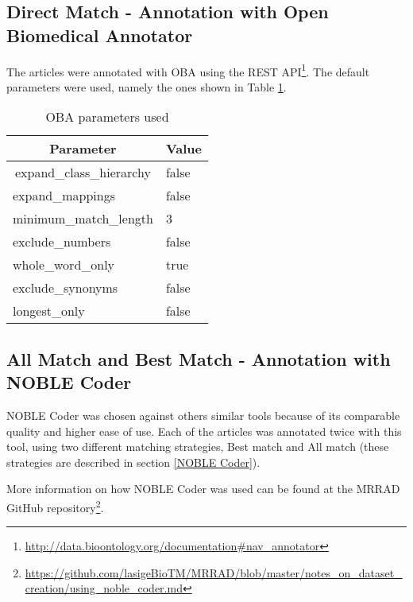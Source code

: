 \subsection{Direct Match - Annotation with Open Biomedical Annotator}

The articles were annotated with OBA using the REST API\footnote{\url{http://data.bioontology.org/documentation\#nav_annotator}}. The default parameters were used, namely the ones shown in Table \ref{table-ncbo-parameters}.

\begin{table}[h]
\centering
\caption{OBA parameters used}
\label{table-ncbo-parameters}
\begin{tabular}{|l|l|}
\hline
\multicolumn{1}{|c|}{\textbf{Parameter}}       & \multicolumn{1}{c|}{\textbf{Value}} \\ \hline
\multicolumn{1}{|c|}{expand\_class\_hierarchy} & false                               \\ \hline
expand\_mappings                               & false                               \\ \hline
minimum\_match\_length                         & 3                                   \\ \hline
exclude\_numbers                               & false                               \\ \hline
whole\_word\_only                              & true                                \\ \hline
exclude\_synonyms                              & false                               \\ \hline
longest\_only                                  & false                               \\ \hline
\end{tabular}
\end{table}

\subsection{All Match and Best Match - Annotation with NOBLE Coder}

NOBLE Coder was chosen against others similar tools because of its comparable quality and higher ease of use. Each of the articles was annotated twice with this tool, using two different matching strategies, Best match and All match (these strategies are described in section \ref{NOBLE Coder}).

More information on how NOBLE Coder was used can be found at the MRRAD GitHub repository\footnote{\url{https://github.com/lasigeBioTM/MRRAD/blob/master/notes_on_dataset_creation/using_noble_coder.md}}.

